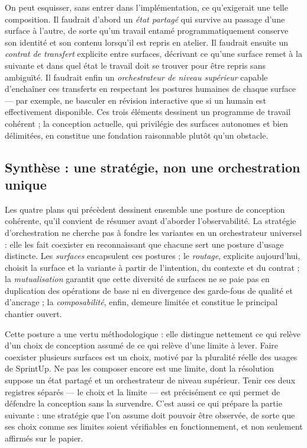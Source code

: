 On peut esquisser, sans entrer dans l'implémentation, ce qu'exigerait
une telle composition. Il faudrait d'abord un \emph{état partagé} qui
survive au passage d'une surface à l'autre, de sorte qu'un travail
entamé programmatiquement conserve son identité et son contenu
lorsqu'il est repris en atelier. Il faudrait ensuite un \emph{contrat
de transfert} explicite entre surfaces, décrivant ce qu'une surface
remet à la suivante et dans quel état le travail doit se trouver pour
être repris sans ambiguïté. Il faudrait enfin un \emph{orchestrateur de
niveau supérieur} capable d'enchaîner ces transferts en respectant les
postures humaines de chaque surface — par exemple, ne basculer en
révision interactive que si un humain est effectivement disponible. Ces
trois éléments dessinent un programme de travail cohérent ; la
conception actuelle, qui privilégie des surfaces autonomes et bien
délimitées, en constitue une fondation raisonnable plutôt qu'un
obstacle.

\subsection{Synthèse : une stratégie, non une orchestration unique}
\label{sec:synthese-orchestration}

Les quatre plans qui précèdent dessinent ensemble une posture de
conception cohérente, qu'il convient de résumer avant d'aborder
l'observabilité. La stratégie d'orchestration ne cherche pas à fondre
les variantes en un orchestrateur universel : elle les fait coexister
en reconnaissant que chacune sert une posture d'usage distincte. Les
\emph{surfaces} encapsulent ces postures ; le \emph{routage}, explicite
aujourd'hui, choisit la surface et la variante à partir de l'intention,
du contexte et du contrat ; la \emph{mutualisation} garantit que cette
diversité de surfaces ne se paie pas en duplication des opérations de
base ni en divergence des garde-fous de qualité et d'ancrage ; la
\emph{composabilité}, enfin, demeure limitée et constitue le principal
chantier ouvert.

Cette posture a une vertu méthodologique : elle distingue nettement ce
qui relève d'un choix de conception assumé de ce qui relève d'une
limite à lever. Faire coexister plusieurs surfaces est un choix, motivé
par la pluralité réelle des usages de SprintUp. Ne pas les composer
encore est une limite, dont la résolution suppose un état partagé et un
orchestrateur de niveau supérieur. Tenir ces deux registres séparés —
le choix et la limite — est précisément ce qui permet de défendre la
conception sans la survendre. C'est aussi ce qui prépare la partie
suivante : une stratégie que l'on assume doit pouvoir être observée, de
sorte que ses choix comme ses limites soient vérifiables en
fonctionnement, et non seulement affirmés sur le papier.

